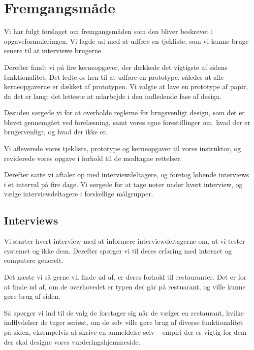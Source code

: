 \documentclass[a4paper, 12pt]{article}
\begin{document}


\newpage

\tableofcontents

\newpage
\setcounter{page}{1}
\fancyfoot[C]{\thepage}

\section{Fremgangsmåde}
\label{sec:Fremgangsmaade}

Vi har fulgt forslaget om fremgangsmåden som den bliver beskrevet i
opgaveformuleringen. Vi lagde ud med at udføre en tjekliste, som vi kunne bruge
senere til at interviewe brugerne.

Derefter fandt vi på fire kerneopgaver, der dækkede det vigtigste af sidens
funktionalitet. Det ledte os hen til at udføre en prototype, således at alle
kerneopgaverne er dækket af prototypen. Vi valgte at lave en prototype af papir,
da det er langt det letteste at udarbejde i den indledende fase af design.

Desuden sørgede vi for at overholde reglerne for brugsvenligt design, som det er
blevet gennemgået ved forelæsning, samt vores egne forestillinger om, hvad der
er brugervenligt, og hvad der ikke er.

Vi afleverede vores tjekliste, prototype og kerneopgaver til vores instruktor,
og reviderede vores opgave i forhold til de modtagne rettelser.

Derefter satte vi aftaler op med interviewdeltagere, og foretog løbende
interviews i et interval på fire dage. Vi sørgede for at tage noter under hvert
interview, og vælge interviewdeltagere i forskellige målgrupper.

\subsection{Interviews}

Vi starter hvert interview med at informere interviewdeltagerne om, at vi tester
systemet og ikke dem. Derefter spørger vi til deres erfaring med internet og
computere generelt.

Det næste vi så gerne vil finde ud af, er deres forhold til restauranter. Det er
for at finde ud af, om de overhovedet er typen der går på restuarant, og ville
kunne gøre brug af siden.

Så spørger vi ind til de valg de foretager sig når de vælger en restaurant,
hvilke indflydelser de tager seriøst, om de selv ville gøre brug af diverse
funktionalitet på siden, eksempelvis at skrive en anmeldelse selv --
empiri der er vigtig for dem der skal designe vores vurderingshjemmeside. 
\end{document}
